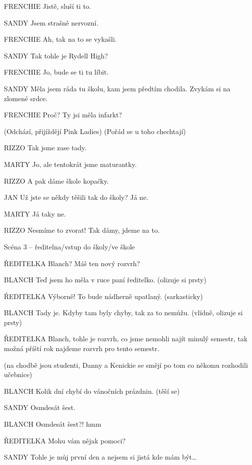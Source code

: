 FRENCHIE                Jistě, sluší ti to.

SANDY                Jsem strašně nervozní.

FRENCHIE                Ah, tak na to se vykašli.

SANDY                Tak tohle je Rydell High?

FRENCHIE                Jo, bude se ti tu líbit.

SANDY                Měla jsem ráda tu školu, kam jsem předtím chodila. Zvykám si na                         zlomené srdce.

FRENCHIE                Proč? Ty jsi měla infarkt?

(Odchází, přijíždějí Pink Ladies) (Pořád se u toho chechtají)

RIZZO                Tak jsme zase tady.

MARTY                Jo, ale tentokrát jsme maturantky.

RIZZO                A pak dáme škole kopačky.

JAN                Už jste se někdy těšili tak do školy? Já ne.

MARTY                Já taky ne.

RIZZO                Nesmíme to zvorat! Tak dámy, jdeme na to.

Scéna 3 – ředitelna/vstup do školy/ve škole 

ŘEDITELKA                Blanch? Máš ten nový rozvrh?

BLANCH                 Teď jsem ho měla v ruce paní ředitelko. (olizuje si prsty)

ŘEDITELKA                 Výborně! To bude nádherně upatlaný. (sarkasticky)

BLANCH                Tady je. Kdyby tam byly chyby, tak za to nemůžu. (vlídně, olizuje si prsty)

ŘEDITELKA                Blanch, tohle je rozvrh, co jsme nemohli najít minulý semestr, tak                         možná příští rok najdeme rozvrh pro tento semestr.

(na chodbě jsou studenti, Danny a Kenickie se smějí po tom co někomu rozhodili učebnice)

BLANCH        Kolik dní chybí do vánočních prázdnin. (těší se)

SANDY        Osmdesát šest.

BLANCH        Osmdesát šest?! hmm

ŘEDITELKA        Mohu vám nějak pomoci?

SANDY        Tohle je můj první den a nejsem si jistá kde mám být…

